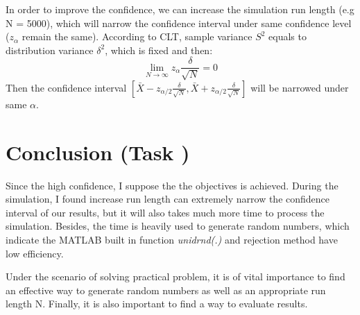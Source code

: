 \documentclass[letterpaper, 10 pt, conference]{ieeeconf}
\begin{document}
In order to improve the confidence, we can increase the simulation run length (e.g N = 5000), which will narrow the confidence interval under same confidence level ($z_\alpha$ remain the same). According to CLT, sample variance $S^2$ equals to distribution variance $\delta^2$, which is fixed and then:
\begin{equation}
  \lim\limits_{N \to \infty } z_\alpha \frac{\delta}{\sqrt{N}} = 0
\end{equation}
Then the confidence interval $[\bar{X}-z_{\alpha/2}\frac{\delta}{\sqrt{N}},\bar{X}+z_{\alpha/2}\frac{\delta}{\sqrt{N}}]$ will be narrowed under same $\alpha$.
\section{Conclusion (Task \uppercase\expandafter{})}
 Since the high confidence, I suppose the the objectives is achieved. During the simulation, I found increase run length can extremely narrow the confidence interval of our results, but it will also takes much more time to process the simulation. Besides, the time is heavily used to generate random numbers, which indicate the MATLAB built in function \textsl{unidrnd(.)} and rejection method have low efficiency.


 Under the scenario of solving practical problem, it is of vital importance to find an effective way to generate random numbers as well as an appropriate run length N. Finally, it is also important to find a way to evaluate results.



\addtolength{\textheight}{-12cm}
\end{document}
